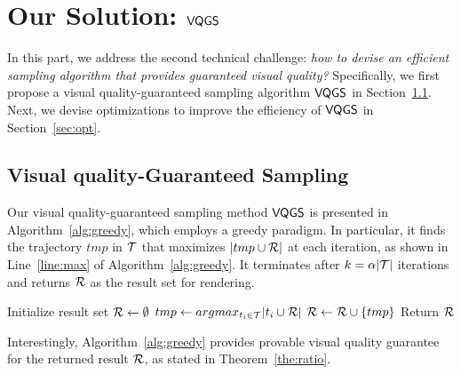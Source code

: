 \section{Our Solution: $\mathsf{VQGS}$}\label{sec:sol}
In this part, we address the second technical challenge: \emph{how to devise an efficient sampling algorithm that provides guaranteed visual quality?}
Specifically, we first propose a visual quality-guaranteed sampling algorithm $\mathsf{VQGS}$ in Section~\ref{sec:greedy}. Next, we devise optimizations to improve the efficiency of $\mathsf{VQGS}$ in Section~\ref{sec:opt}.

\subsection{Visual quality-Guaranteed Sampling}\label{sec:greedy}

Our visual quality-guaranteed sampling method $\mathsf{VQGS}$ is presented in Algorithm~\ref{alg:greedy}, which employs a greedy paradigm.
In particular, it finds the trajectory $tmp$ in $\mathcal{T}$ that maximizes $| tmp \cup \mathcal{R}|$ at each iteration, as shown in Line~\ref{line:max} of Algorithm~\ref{alg:greedy}.
It terminates after $k=\alpha |\mathcal{T}|$ iterations and returns $\mathcal{R}$ as the result set for rendering.

\begin{algorithm}
    \caption{$\vats(\D,k=\alpha |\D|)$} \label{alg:greedy}
    \begin{algorithmic}[1]
    \State Initialize result set $\mathcal{R} \leftarrow \emptyset$
        \State $tmp \leftarrow argmax_{t_i \in \mathcal{T}} |t_i \cup \mathcal{R}|$ \label{line:max}
        \State $\mathcal{R} \leftarrow \mathcal{R} \cup \{ tmp \}$
    \EndWhile
    \State Return $\mathcal{R}$
    \end{algorithmic}
\end{algorithm}


Interestingly, Algorithm~\ref{alg:greedy} provides provable visual quality guarantee for the returned result $\mathcal{R}$, as stated in Theorem~\ref{the:ratio}.


